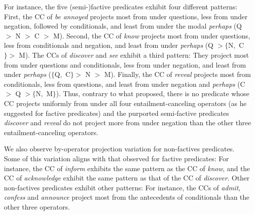 \documentclass[a4paper,12pt,twoside]{article}
\begin{document}
        
        
        For instance, the five (semi-)factive predicates exhibit four different patterns:
        First, the CC of \emph{be annoyed} projects
        most from under questions, less from under negation, followed by conditionals, and least from under the modal \emph{perhaps} (\textcolor{op-q-color}{Q} $>$ \textcolor{op-n-color}{N} $>$ \textcolor{op-c-color}{C} $>$ \textcolor{op-m-color}{M}).
        Second, the CC of \emph{know} projects most from under questions, less from conditionals and negation, and least from under {\em perhaps} (\textcolor{op-q-color}{Q} $> \{$\textcolor{op-n-color}{N}$,$ \textcolor{op-c-color}{C}$\} >$ \textcolor{op-m-color}{M}).
        The CCs of \emph{discover} and \emph{see} exhibit a third pattern: They project most from under questions and conditionals, less from under negation, and least from under \emph{perhaps} ($\{$\textcolor{op-q-color}{Q}$,$ \textcolor{op-c-color}{C}$\}>$ \textcolor{op-n-color}{N} $>$ \textcolor{op-m-color}{M}).
        Finally, the CC of \emph{reveal} projects most from conditionals, less from questions, and least from under negation and \emph{perhaps} (\textcolor{op-c-color}{C} $>$ \textcolor{op-q-color}{Q}  $> \{$\textcolor{op-n-color}{N}$,$ \textcolor{op-m-color}{M}$\}$).
        Thus, contrary to what \citealt{karttunen_observations_1971} proposed, there is no predicate whose CC projects uniformly from under all four entailment-canceling operators (as he suggested for factive predicates) and the purported semi-factive predicates  \emph{discover} and \emph{reveal} do not project more from under negation than the other three entailment-canceling operators.
        
        We also observe by-operator projection variation for non-factives predicates. Some of this variation aligns with that observed for factive predicates: For instance, the CC of \emph{inform} exhibits the same pattern as the CC of \emph{know}, and the CC of \emph{acknowledge} exhibit the same pattern as that of the CC of \emph{discover}. Other non-factives predicates exhibit other patterns: For instance, the CCs of \emph{admit}, \emph{confess} and \emph{announce} project most from the antecedents of conditionals than the other three operators. 
\end{document}
